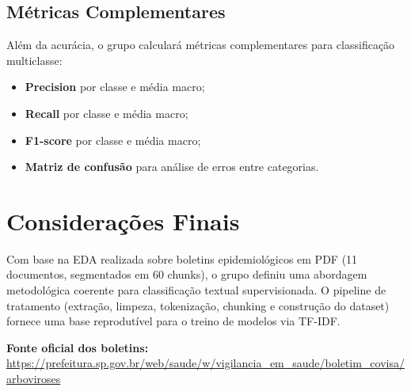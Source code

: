\subsection{Métricas Complementares}

Além da acurácia, o grupo calculará métricas complementares para classificação multiclasse:
\begin{itemize}[leftmargin=1.2cm]
    \item \textbf{Precision} por classe e média macro;
    \item \textbf{Recall} por classe e média macro;
    \item \textbf{F1-score} por classe e média macro;
    \item \textbf{Matriz de confusão} para análise de erros entre categorias.
\end{itemize}

\clearpage
\section{Considerações Finais}

Com base na EDA realizada sobre boletins epidemiológicos em PDF (11 documentos, segmentados em 60 chunks), o grupo definiu uma abordagem metodológica coerente para classificação textual supervisionada. O pipeline de tratamento (extração, limpeza, tokenização, chunking e construção do dataset) fornece uma base reprodutível para o treino de modelos via TF-IDF.

\vspace{0.3cm}
\noindent
\textbf{Fonte oficial dos boletins:} \\
\url{https://prefeitura.sp.gov.br/web/saude/w/vigilancia_em_saude/boletim_covisa/arboviroses}

